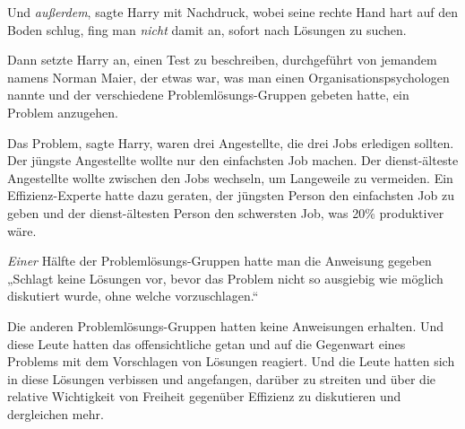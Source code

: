 Und \emph{außerdem}, sagte Harry mit Nachdruck, wobei seine rechte Hand hart auf den Boden schlug, fing man \emph{nicht} damit an, sofort nach Lösungen zu suchen.

Dann setzte Harry an, einen Test zu beschreiben, durchgeführt von jemandem namens Norman Maier, der etwas war, was man einen Organisationspsychologen nannte und der verschiedene Problemlösungs-Gruppen gebeten hatte, ein Problem anzugehen.

Das Problem, sagte Harry, waren drei Angestellte, die drei Jobs erledigen sollten. Der jüngste Angestellte wollte nur den einfachsten Job machen. Der dienst-älteste Angestellte wollte zwischen den Jobs wechseln, um Langeweile zu vermeiden. Ein Effizienz-Experte hatte dazu geraten, der jüngsten Person den einfachsten Job zu geben und der dienst-ältesten Person den schwersten Job, was 20\% produktiver wäre.

\emph{Einer} Hälfte der Problemlösungs-Gruppen hatte man die Anweisung gegeben „Schlagt keine Lösungen vor, bevor das Problem nicht so ausgiebig wie möglich diskutiert wurde, ohne welche vorzuschlagen.“

Die anderen Problemlösungs-Gruppen hatten keine Anweisungen erhalten. Und diese Leute hatten das offensichtliche getan und auf die Gegenwart eines Problems mit dem Vorschlagen von Lösungen reagiert. Und die Leute hatten sich in diese Lösungen verbissen und angefangen, darüber zu streiten und über die relative Wichtigkeit von Freiheit gegenüber Effizienz zu diskutieren und dergleichen mehr.

